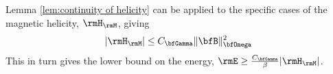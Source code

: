     \begin{corollary}
        Lemma \ref{lem:continuity of helicity} can be applied to the specific cases of the magnetic helicity, $\rmH_{\rmM}$, giving
        \begin{equation}
            |\rmH_{\rmM}|  \leq  C_{\bfGamma}\|\bfB\|_{\bfOmega}^{2}
        \end{equation}
        This in turn gives the lower bound on the energy, $\rmE  \geq  \frac{C_{\bfGamma}}{\beta}|\rmH_{\rmM}|$.
    \end{corollary}


    \line